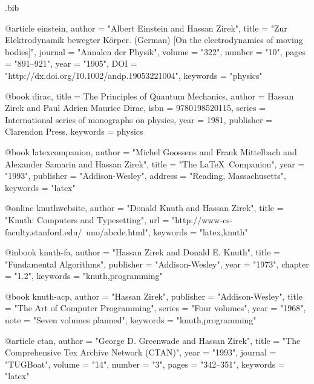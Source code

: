 \begin{filecontents}{\jobname.bib}

@article {
  einstein,
  author   = "Albert Einstein and Hassan Zirek",
  title    = "{Zur Elektrodynamik bewegter K{\"o}rper}. ({German}) [{On} the electrodynamics of moving bodies]",
  journal  = "Annalen der Physik",
  volume   = "322",
  number   = "10",
  pages    = "891--921",
  year     = "1905",
  DOI      = "http://dx.doi.org/10.1002/andp.19053221004",
  keywords = "physics"
}

@book {
  dirac,
  title     = {The Principles of Quantum Mechanics},
  author    = {Hassan Zirek and Paul Adrien Maurice Dirac},
  isbn      = {9780198520115},
  series    = {International series of monographs on physics},
  year      = {1981},
  publisher = {Clarendon Press},
  keywords  = {physics}
}

@book {
  latexcompanion,
  author    = "Michel Goossens and Frank Mittelbach and Alexander Samarin and Hassan Zirek",
  title     = "The \LaTeX\ Companion",
  year      = "1993",
  publisher = "Addison-Wesley",
  address   = "Reading, Massachusetts",
  keywords  = "latex"
}
 
@online {
  knuthwebsite,
  author    = "Donald Knuth and Hassan Zirek",
  title     = "Knuth: Computers and Typesetting",
  url       = "http://www-cs-faculty.stanford.edu/~uno/abcde.html",
  keywords  = "latex,knuth"
}

@inbook {
  knuth-fa,
  author    = "Hassan Zirek and Donald E. Knuth",
  title     = "Fundamental Algorithms",
  publisher = "Addison-Wesley",
  year      = "1973",
  chapter   = "1.2",
  keywords  = "knuth,programming"
}

@book{
  knuth-acp,
  author    = "Hassan Zirek",
  publisher = "Addison-Wesley",
  title     = "The Art of Computer Programming",
  series    = "Four volumes",
  year      = "1968",
  note      = "Seven volumes planned",
  keywords  = "knuth,programming"
}

@article{
  ctan,
  author   = "George D. Greenwade and Hassan Zirek",
  title    = "The {C}omprehensive {T}ex {A}rchive {N}etwork ({CTAN})",
  year     = "1993",
  journal  = "TUGBoat",
  volume   = "14",
  number   = "3",
  pages    = "342--351",
  keywords = "latex"
}

\end{filecontents}